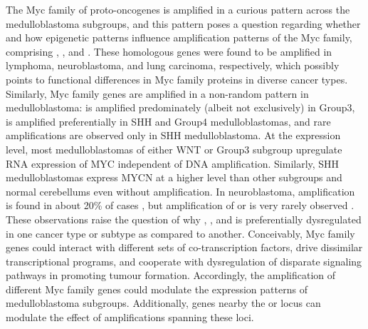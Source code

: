The Myc family of proto-oncogenes is amplified in a curious pattern across the medulloblastoma subgroups, and this pattern poses a question regarding whether and how epigenetic patterns influence amplification patterns of the Myc family, comprising , , and . These homologous genes were found to be amplified in lymphoma, neuroblastoma, and lung carcinoma, respectively, which possibly points to functional differences in Myc family proteins in diverse cancer types. Similarly, Myc family genes are amplified in a non-random pattern in medulloblastoma:  is amplified predominately (albeit not exclusively) in Group3,  is amplified preferentially in SHH and Group4 medulloblastomas, and rare  amplifications are observed only in SHH medulloblastoma. At the expression level, most medulloblastomas of either WNT or Group3 subgroup upregulate RNA expression of MYC independent of DNA amplification. Similarly, SHH medulloblastomas express MYCN at a higher level than other subgroups and normal cerebellums even without  amplification. 
In neuroblastoma,  amplification is found in about 20\% of cases , but amplification of  or  is very rarely observed . These observations raise the question of why , , and  is preferentially dysregulated in one cancer type or subtype as compared to another. Conceivably, Myc family genes could interact with different sets of co-transcription factors, drive dissimilar transcriptional programs, and cooperate with dysregulation of disparate signaling pathways in promoting tumour formation. Accordingly, the amplification of different Myc family genes could modulate the expression patterns of medulloblastoma subgroups. Additionally, genes nearby the  or  locus can modulate the effect of amplifications spanning these loci.

